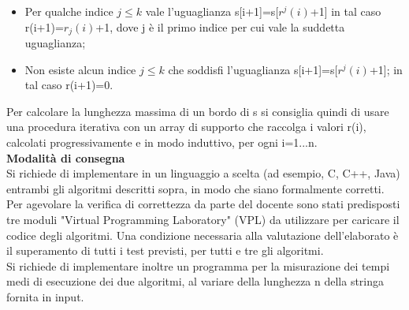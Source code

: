 \begin{itemize}
    \item Per qualche indice $j \leq k$ vale l'uguaglianza s[i+1]=s[$r^j(i)$+1] in tal caso r(i+1)=$r_j(i)$+1, dove j è il primo indice per cui vale la suddetta uguaglianza;
    \item Non esiste alcun indice $j \leq k$ che soddisfi l'uguaglianza s[i+1]=s[$r^j(i)$+1]; in tal caso r(i+1)=0.
\end{itemize}
Per calcolare la lunghezza massima di un bordo di s si consiglia quindi di usare una procedura iterativa con un array di supporto che raccolga i valori r(i), calcolati progressivamente e in modo induttivo, per ogni i=1...n.
\vspace{3mm}\\
\textbf{Modalità di consegna}
\\Si richiede di implementare in un linguaggio a scelta (ad esempio, C, C++, Java) entrambi gli algoritmi descritti sopra, in modo che siano formalmente corretti. Per agevolare la verifica di correttezza da parte del docente sono stati predisposti tre moduli "Virtual Programming Laboratory" (VPL) da utilizzare per caricare il codice degli algoritmi. Una condizione necessaria alla valutazione dell'elaborato è il superamento di tutti i test previsti, per tutti e tre gli algoritmi.
\vspace{3mm}
\\Si richiede di implementare inoltre un programma per la misurazione dei tempi medi di esecuzione dei due algoritmi, al variare della lunghezza n della stringa fornita in input.
